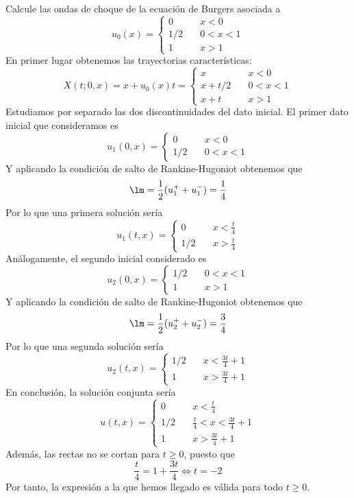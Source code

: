\documentclass[12pt]{article}
\begin{document}
    \begin{ejercicio}
        Calcule las ondas de choque de la ecuación de Burgers asociada a
        $$u_0(x) = \begin{cases}
            0 \quad& x<0 \\
            1/2 \quad& 0<x<1 \\
            1 \quad& x>1
        \end{cases}$$
        En primer lugar obtenemos las trayectorias características:
        $$X(t; 0, x) = x + u_0(x) t = \begin{cases}
            x \quad& x < 0 \\
            x + t/2 \quad& 0 < x < 1 \\
            x + t \quad& x > 1
        \end{cases}$$
        Estudiamos por separado las dos discontinuidades del dato inicial. El primer dato inicial que consideramos es 
        $$u_1(0,x) = \begin{cases}
            0 \quad& x < 0 \\
            1/2 \quad& 0 < x < 1
        \end{cases}$$
        Y aplicando la condición de salto de Rankine-Hugoniot obtenemos que 
        $$\lm = \dfrac{1}{2}(u_1^{+} + u_1^{-}) = \dfrac{1}{4}$$
        Por lo que una primera solución sería 
        $$u_1(t,x) = \begin{cases}
            0 \quad& x < \frac{t}{4} \\
            1/2 \quad& x > \frac{t}{4}
        \end{cases}$$
        Análogamente, el segundo inicial considerado es 
        $$u_2(0,x) = \begin{cases}
            1/2 \quad& 0 < x < 1 \\
            1 \quad& x > 1
        \end{cases}$$
        Y aplicando la condición de salto de Rankine-Hugoniot obtenemos que 
        $$\lm = \dfrac{1}{2}(u_2^{+} + u_2^{-}) = \dfrac{3}{4}$$
        Por lo que una segunda solución sería 
        $$u_2(t,x) = \begin{cases}
            1/2 \quad& x < \frac{3t}{4} + 1 \\
            1 \quad& x > \frac{3t}{4} + 1
        \end{cases}$$
        En conclusión, la solución conjunta sería 
        $$u(t,x) = \begin{cases}
            0 \quad& x < \frac{t}{4} \\
            1/2 \quad& \frac{t}{4} < x < \frac{3t}{4} + 1 \\
            1 \quad& x > \frac{3t}{4} + 1
        \end{cases}$$
        Además, las rectas no se cortan para $t\geq0$, puesto que
        $$\dfrac{t}{4}= 1+\dfrac{3t}{4} \iff t=-2$$
        Por tanto, la expresión a la que hemos llegado es válida para todo $t\geq0$.
    \end{ejercicio}
\end{document}

